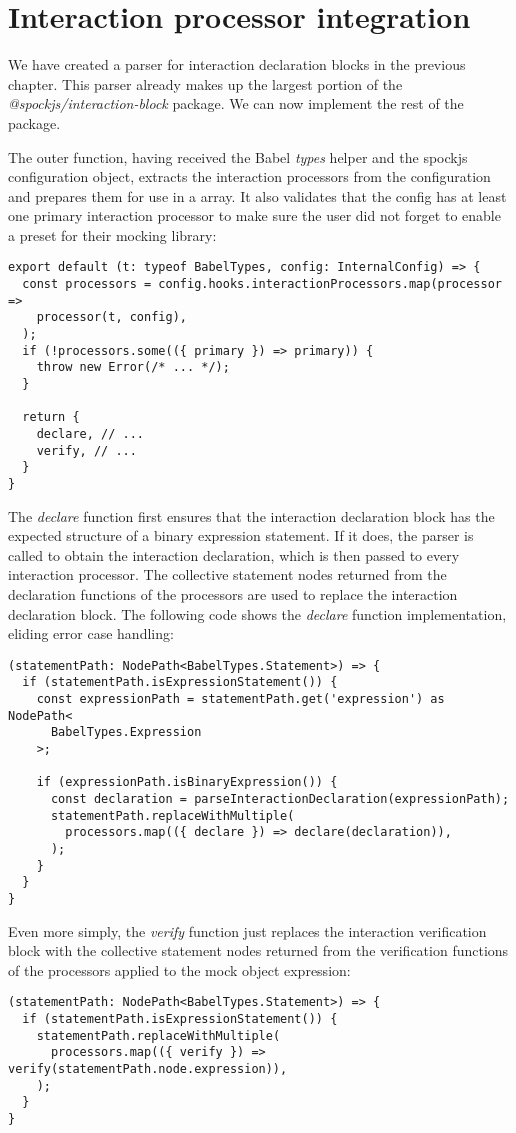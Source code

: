 \section{Interaction processor integration}
We have created a parser for
interaction declaration blocks
in the previous chapter.
This parser already makes up the largest portion of the
\textit{@spockjs/interaction-block} package.
We can now implement the rest of the package.

The outer function,
having received the Babel \textit{types} helper
and the spockjs configuration object,
extracts the interaction processors from the configuration
and prepares them for use in a  array.
It also validates that the config has at least one
primary interaction processor to make sure
the user did not forget to enable a preset for their mocking library:
\begin{verbatim}
export default (t: typeof BabelTypes, config: InternalConfig) => {
  const processors = config.hooks.interactionProcessors.map(processor =>
    processor(t, config),
  );
  if (!processors.some(({ primary }) => primary)) {
    throw new Error(/* ... */);
  }

  return {
    declare, // ...
    verify, // ...
  }
}
\end{verbatim}

The \textit{declare} function first ensures that
the interaction declaration block has the expected structure
of a binary expression statement.
If it does, the parser is called
to obtain the interaction declaration,
which is then passed to every
interaction processor.
The collective statement nodes returned from
the declaration functions of the processors
are used to replace the interaction declaration block.
The following code shows the \textit{declare} function implementation,
eliding error case handling:
\begin{verbatim}
(statementPath: NodePath<BabelTypes.Statement>) => {
  if (statementPath.isExpressionStatement()) {
    const expressionPath = statementPath.get('expression') as NodePath<
      BabelTypes.Expression
    >;

    if (expressionPath.isBinaryExpression()) {
      const declaration = parseInteractionDeclaration(expressionPath);
      statementPath.replaceWithMultiple(
        processors.map(({ declare }) => declare(declaration)),
      );
    }
  }
}
\end{verbatim}

Even more simply,
the \textit{verify} function just replaces the interaction verification block
with the collective statement nodes returned from
the verification functions of the processors
applied to the mock object expression:
\begin{verbatim}
(statementPath: NodePath<BabelTypes.Statement>) => {
  if (statementPath.isExpressionStatement()) {
    statementPath.replaceWithMultiple(
      processors.map(({ verify }) => verify(statementPath.node.expression)),
    );
  }
}
\end{verbatim}

